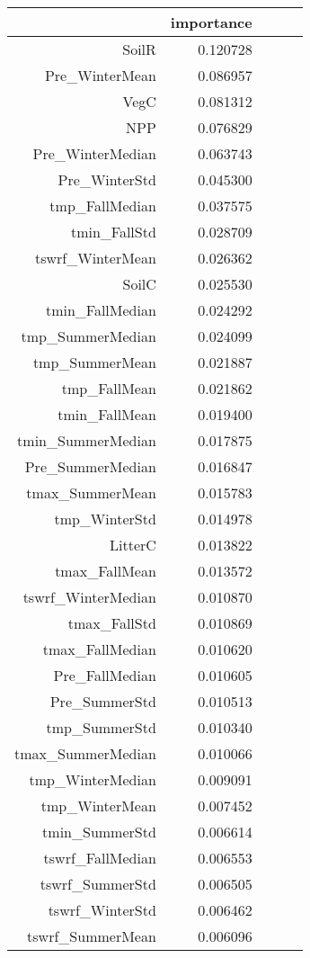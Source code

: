 \begin{table}[h]
\centering
\label{table:5}
\begin{tabular}{rrrrr}
\toprule
 & importance \\
\midrule
SoilR & 0.120728 \\
Pre_WinterMean & 0.086957 \\
VegC & 0.081312 \\
NPP & 0.076829 \\
Pre_WinterMedian & 0.063743 \\
Pre_WinterStd & 0.045300 \\
tmp_FallMedian & 0.037575 \\
tmin_FallStd & 0.028709 \\
tswrf_WinterMean & 0.026362 \\
SoilC & 0.025530 \\
tmin_FallMedian & 0.024292 \\
tmp_SummerMedian & 0.024099 \\
tmp_SummerMean & 0.021887 \\
tmp_FallMean & 0.021862 \\
tmin_FallMean & 0.019400 \\
tmin_SummerMedian & 0.017875 \\
Pre_SummerMedian & 0.016847 \\
tmax_SummerMean & 0.015783 \\
tmp_WinterStd & 0.014978 \\
LitterC & 0.013822 \\
tmax_FallMean & 0.013572 \\
tswrf_WinterMedian & 0.010870 \\
tmax_FallStd & 0.010869 \\
tmax_FallMedian & 0.010620 \\
Pre_FallMedian & 0.010605 \\
Pre_SummerStd & 0.010513 \\
tmp_SummerStd & 0.010340 \\
tmax_SummerMedian & 0.010066 \\
tmp_WinterMedian & 0.009091 \\
tmp_WinterMean & 0.007452 \\
tmin_SummerStd & 0.006614 \\
tswrf_FallMedian & 0.006553 \\
tswrf_SummerStd & 0.006505 \\
tswrf_WinterStd & 0.006462 \\
tswrf_SummerMean & 0.006096 \\

\end{tabular}
\end{table}
